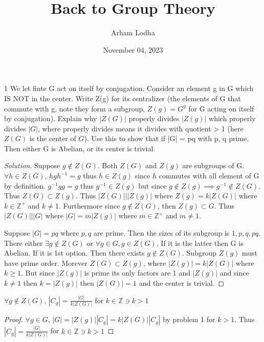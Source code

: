 \documentclass{article}
\newcommand{\Z}{\mathbb{Z}}
\newenvironment{solution}
{\renewcommand\qedsymbol{$\blacksquare$}\begin{proof}[Solution]}
{\end{proof}}
\begin{document}
\title{Back to Group Theory}
\author{Arham Lodha}%
\date{November 04, 2023}%
\maketitle

\begin{PROB}{1}\label{Problem 1.}
    We let finte G act on itself by conjugation. Consider an element g in G which IS NOT in the center. Write Z(g) for its centralizer (the elements of G that commute with g, note they form a subgroup, $Z(g) = G^g$ for G acting on itself by conjugation). Explain why $|Z(G)|$ properly divides $|Z(g)|$ which properly divides $|G|$, where properly divides means it divides with quotient > 1 (here $Z(G)$ is the center of $G$). Use this to show that if |G| = pq with p, q prime. Then either G is Abelian, or its center is trivial. 
\end{PROB}
\begin{solution}
    Suppose $g \not \in Z(G)$. Both $Z(G)$ and $Z(g)$ are subgroups of G. $\forall h \in Z(G)$, $hgh^{-1} = g$ thus $h \in Z(g)$ since $h$ commutes with all element of G by definition. $g^{-1}gg = g$ thus $g^{-1} \in Z(g)$ but since $g \not \in Z(g) \implies g^{-1} \not \in Z(G)$. Thus $Z(G) \subset Z(g)$. Thus $|Z(G)| | | Z(g)|$ where $Z(g) = k|Z(G)|$ where $k \in \Z^+$ and $k \neq 1$. Furthermore since $g \not \in Z(G)$, then $Z(g) \subset G$. Thus $|Z(G)| | |G|$ where $|G| = m|Z(g)|$ where $m \in \Z^+$ and $m \neq 1$.


    Suppose $|G| = pq$ where $p, q$ are prime. Then the sizes of its subgroup is $1, p, q, pq$. There either $\exists g \not \in Z(G)$ or $\forall g \in G, g \in Z(G)$. If it is the latter then G is Abelian. If it is 1st option. Then there exists $g \not \in Z(G)$. Subgroup $Z(g)$ must have prime order. Morever $Z(G) \subset Z(g)$, where $|Z(g)| = k|Z(G)|$ where $k \geq 1$. But since $|Z(g)|$ is prime its only factors are 1 and $|Z(g)|$ and since $k \neq 1$ then $k = |Z(g)|$ then $|Z(G)| = 1$ and the center is trivial.
\end{solution}

\bigskip

\begin{LEM}{}
    $\forall g \not \in Z(G)$, $|C_g| = \frac{|G|}{k|Z(G)|}$ for $k \in \Z \ni k > 1$
\end{LEM}
\begin{proof}
    $\forall g \in G$, $|G| = |Z(g)||C_g| = k|Z(G)||C_g|$ by problem 1 for $k > 1$. Thus $|C_g| = \frac{|G|}{k|Z(G)|}$ for $k \in \Z \ni k > 1$
\end{proof}
\end{document}
